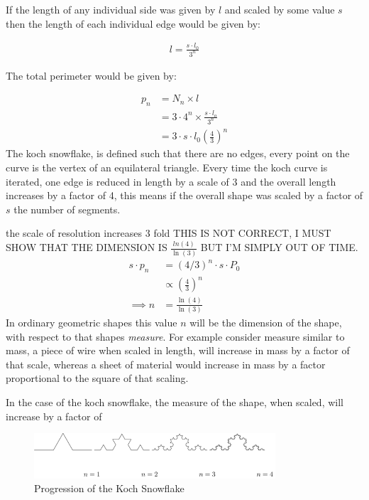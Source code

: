 \documentclass[11pt]{article}
\begin{document}
If the length of any individual side was given by \(l\) and scaled by some value \(s\) then the length of each individual edge would be given by:

\begin{align}
l = \frac{s \cdot l_{0}}{3^{n}}
\end{align}

The total perimeter would be given by:

\begin{align}
p_{n} &= N_{n} \times l \\
&= 3\cdot 4^{n} \times \frac{s \cdot l_{o}}{3^{n}} \\
&= 3 \cdot s \cdot  l_{0} \left( \frac{4}{3} \right)^{n}
\end{align}
The koch snowflake, is defined such that there are no edges, every point on the curve is the vertex of an equilateral triangle. Every time the koch curve is iterated, one edge is reduced in length by a scale of 3 and the overall length increases by a factor of 4, this means if the overall shape was scaled by a factor of \(s\) the number of segments.

the scale of resolution increases 3 fold
THIS IS NOT CORRECT, I MUST SHOW THAT THE DIMENSION IS \(\frac{ln(4)}{\ln(3)}\) BUT I'M SIMPLY OUT OF TIME.
\begin{align}
s \cdot p_{n} &=  (4/3)^{n} \cdot s \cdot P_{0}\\
& \propto \left(\frac{4}{3}\right)^{n} \\
 \implies  n &= \frac{\ln\left( 4 \right)}{\ln\left( 3 \right)} \label{eq:koch-dim}
\end{align}
In ordinary geometric shapes this value \(n\) will be the dimension of the shape,
with respect to that shapes \emph{measure}. For example consider measure similar to mass, a piece
of wire when scaled in length, will increase in mass by a factor of that scale, whereas
a sheet of material would increase in mass by a factor proportional to the square of that scaling.

In the case of the koch snowflake, the measure of the shape, when scaled, will increase by a factor of


\begin{figure}[htbp]
\centering
\includegraphics[width=9cm]{media/tikz/Koch_line.png}
\caption{\label{koch-line}Progression of the Koch Snowflake}
\end{figure}
\end{document}
